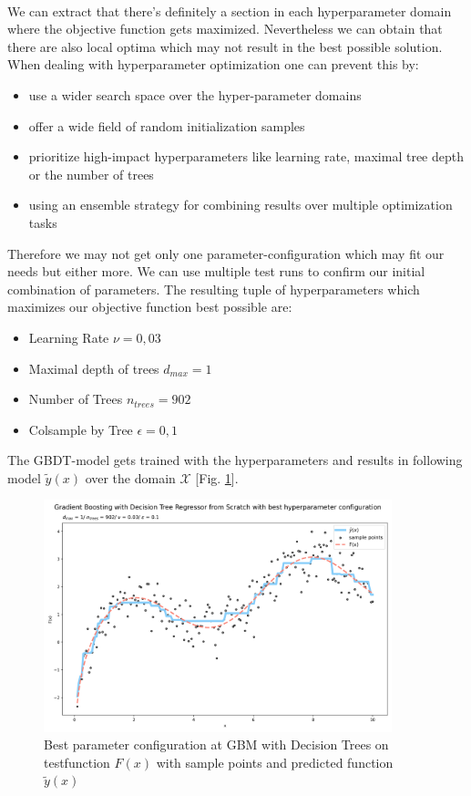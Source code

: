\documentclass[12pt, a4paper]{article}
\begin{document}
\\
We can extract that there's definitely a section in each hyperparameter domain where the objective function gets maximized. Nevertheless we can obtain that there are also local optima which may not result in the best possible solution. When dealing with hyperparameter optimization one can prevent this by:
\begin{itemize}
    \item use a wider search space over the hyper-parameter domains
    \item offer a wide field of random initialization samples
    \item prioritize high-impact hyperparameters like learning rate, maximal tree depth or the number of trees
    \item using an ensemble strategy for combining results over multiple optimization tasks
\end{itemize}
Therefore we may not get only one parameter-configuration which may fit our needs but either more. We can use multiple test runs to confirm our initial combination of parameters. The resulting tuple of hyperparameters which maximizes our objective function best possible are:
\begin{itemize}
    \item Learning Rate $\nu = 0{,}03$
    \item Maximal depth of trees $d_{max} = 1$
    \item Number of Trees $n_{trees} = 902$
    \item Colsample by Tree $\epsilon = 0{,}1$
\end{itemize}
The GBDT-model gets trained with the hyperparameters and results in following model $\tilde{y}(x)$ over the domain $\mathcal{X}$ [Fig. \ref{fig: gbm_dt_best_par}].
\begin{figure}[!htpb]
    \centering
    \includegraphics[width=0.9\textwidth,trim={0 0 0 0},clip]{figures/gbm_with_decision_tree_best_parameters.png}
    \caption[Best parameter configuration at GBM with Decision Trees on testfunction]{Best parameter configuration at GBM with Decision Trees on testfunction $F(x)$ with sample points and predicted function $\tilde{y}(x)$}
    \label{fig: gbm_dt_best_par}
\end{figure}
\newpage
\end{document}
